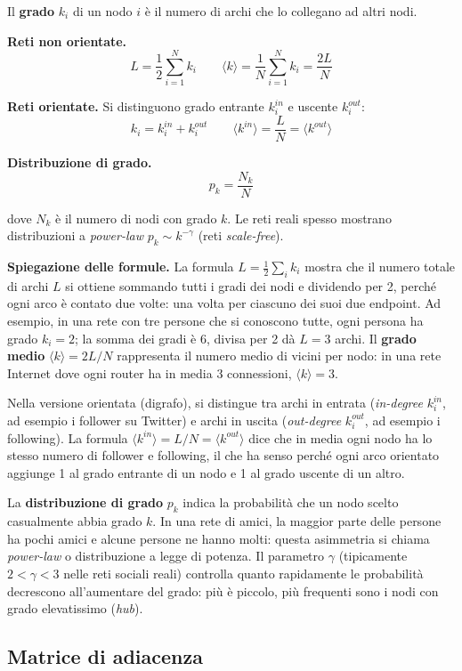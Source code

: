 \documentclass[12pt,a4paper]{article}
\newcommand{\formula}[1]{%
  \begin{equation*}#1\end{equation*}%
}
\begin{document}
Il \textbf{grado} $k_i$ di un nodo $i$ è il numero di archi che lo collegano ad altri nodi.

\textbf{Reti non orientate.}
\formula{L = \frac{1}{2}\sum_{i=1}^{N} k_i \qquad \langle k \rangle = \frac{1}{N}\sum_{i=1}^{N} k_i = \frac{2L}{N}}

\textbf{Reti orientate.} Si distinguono grado entrante $k_i^{in}$ e uscente $k_i^{out}$:
\formula{k_i = k_i^{in} + k_i^{out} \qquad
  \langle k^{in} \rangle = \frac{L}{N} = \langle k^{out} \rangle}

\textbf{Distribuzione di grado.}
\formula{p_k = \frac{N_k}{N}}
dove $N_k$ è il numero di nodi con grado $k$. Le reti reali spesso mostrano distribuzioni
a \textit{power-law} $p_k \sim k^{-\gamma}$ (reti \emph{scale-free}).

\medskip
\noindent\textbf{Spiegazione delle formule.}
La formula $L = \frac{1}{2}\sum_{i} k_i$ mostra che il numero totale di archi $L$ si ottiene
sommando tutti i gradi dei nodi e dividendo per 2, perché ogni arco è contato due volte: una
volta per ciascuno dei suoi due endpoint. Ad esempio, in una rete con tre persone che si
conoscono tutte, ogni persona ha grado $k_i = 2$; la somma dei gradi è 6, divisa per 2 dà
$L = 3$ archi. Il \textbf{grado medio} $\langle k \rangle = 2L/N$ rappresenta il numero
medio di vicini per nodo: in una rete Internet dove ogni router ha in media 3 connessioni,
$\langle k \rangle = 3$.

Nella versione orientata (digrafo), si distingue tra archi in entrata (\textit{in-degree}
$k_i^{in}$, ad esempio i follower su Twitter) e archi in uscita (\textit{out-degree}
$k_i^{out}$, ad esempio i following). La formula $\langle k^{in} \rangle = L/N = \langle k^{out} \rangle$
dice che in media ogni nodo ha lo stesso numero di follower e following, il che ha senso
perché ogni arco orientato aggiunge 1 al grado entrante di un nodo e 1 al grado uscente di un altro.

La \textbf{distribuzione di grado} $p_k$ indica la probabilità che un nodo scelto casualmente
abbia grado $k$. In una rete di amici, la maggior parte delle persone ha pochi amici e alcune
persone ne hanno molti: questa asimmetria si chiama \emph{power-law} o distribuzione a legge
di potenza. Il parametro $\gamma$ (tipicamente $2 < \gamma < 3$ nelle reti sociali reali)
controlla quanto rapidamente le probabilità decrescono all'aumentare del grado: più è piccolo,
più frequenti sono i nodi con grado elevatissimo (\emph{hub}).

\subsection{Matrice di adiacenza}
\end{document}
